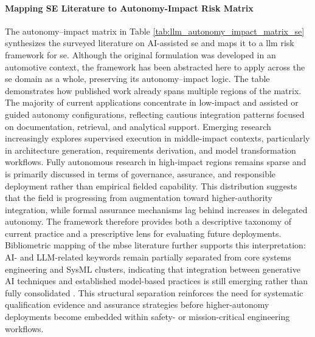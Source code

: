 \paragraph{Mapping SE Literature to Autonomy-Impact Risk Matrix}

The autonomy–impact matrix in Table \ref{tab:llm_autonomy_impact_matrix_se} synthesizes the surveyed literature on AI-assisted \ac{se} and maps it to a \ac{llm} risk framework for \ac{se}. Although the original formulation was developed in an automotive context, the framework has been abstracted here to apply across the \ac{se} domain as a whole, preserving its autonomy–impact logic. The table demonstrates how published work already spans multiple regions of the matrix. The majority of current applications concentrate in low-impact and assisted or guided autonomy configurations, reflecting cautious integration patterns focused on documentation, retrieval, and analytical support. Emerging research increasingly explores supervised execution in middle-impact contexts, particularly in architecture generation, requirements derivation, and model transformation workflows. Fully autonomous research in high-impact regions remains sparse and is primarily discussed in terms of governance, assurance, and responsible deployment rather than empirical fielded capability. This distribution suggests that the field is progressing from augmentation toward higher-authority integration, while formal assurance mechanisms lag behind increases in delegated autonomy. The framework therefore provides both a descriptive taxonomy of current practice and a prescriptive lens for evaluating future deployments. Bibliometric mapping of the \ac{mbse} literature further supports this interpretation: AI- and LLM-related keywords remain partially separated from core systems engineering and SysML clusters, indicating that integration between generative AI techniques and established model-based practices is still emerging rather than fully consolidated \cite{muthukumar_MappingLandscapeModelbased_2026}. This structural separation reinforces the need for systematic qualification evidence and assurance strategies before higher-autonomy deployments become embedded within safety- or mission-critical engineering workflows. 


\renewcommand{\arraystretch}{1.35}
\setlength{\tabcolsep}{6pt}

